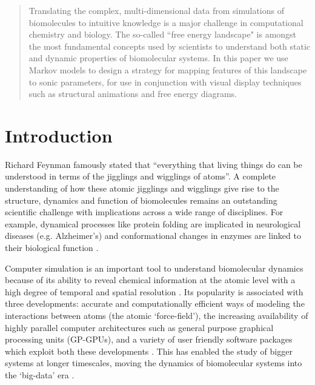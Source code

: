 \documentclass[a4paper,10pt,oneside]{article}
\begin{document}
\begin{sloppy}

\begin{abstract}
Translating the complex, multi-dimensional data from simulations of biomolecules to intuitive  knowledge is a major challenge in computational chemistry and biology. The so-called ``free energy landscape" is amongst the most fundamental concepts used by scientists to understand both static and dynamic properties of biomolecular systems. In this paper we use Markov models to design a strategy for mapping features of this landscape to sonic parameters, for use in conjunction with visual display techniques such as structural animations and free energy diagrams.  
\end{abstract}

\section{Introduction}

\label{sec:intro}
Richard Feynman famously stated \cite{Feynman} that ``everything that living things do can be understood in terms of the jigglings and wigglings of atoms''.  A complete understanding of how these atomic jigglings and wigglings give rise to the structure, dynamics and  function of biomolecules remains an outstanding scientific challenge with implications across a wide range of disciplines. For example, dynamical processes like protein folding are implicated in neurological diseases (e.g. Alzheimer's) \cite{Hashimoto2003} and conformational changes in enzymes are linked to their biological function \cite{Singh2015}.  

Computer simulation is an important tool to understand biomolecular dynamics because of its ability to reveal chemical information at the atomic level  with a high degree of temporal and spatial resolution \cite{Adcock2006,Antoniou2006}. Its popularity is associated with three developments: accurate and computationally efficient ways of modeling the interactions between atoms (the atomic `force-field')\cite{Kamp2008, Mackerell2004}, the increasing availability of highly parallel computer architectures such as general purpose graphical processing units (GP-GPUs)\cite{Stone2010}, and a variety of user friendly software packages which exploit both these developments \cite{Openmm4, amber}. This has enabled the study of bigger systems at longer timescales, moving the dynamics of biomolecular systems into the `big-data' era \cite{Graaf2015}. 


\end{sloppy}
\end{document}
